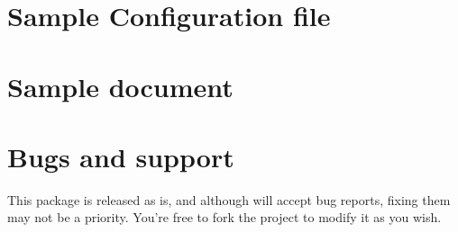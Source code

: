 \documentclass[11pt]{article}
\begin{document}
\section{Sample Configuration file}


\section{Sample document}

\section{Bugs and support}
This package is released as is, and although will accept bug reports, fixing them may not be a priority. You're free to fork the project to modify it as you wish.



\end{document}
